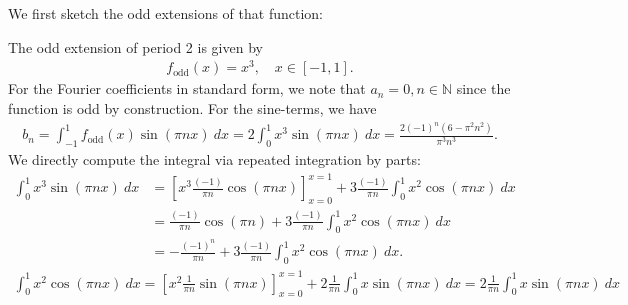 \documentclass[11pt]{article}
\begin{document}
\begin{solution}
    We first sketch the odd extensions of that function:
    \begin{center}
    \end{center}
    The odd extension of period 2 is given by
    \begin{align*}
        f_{\text{odd}}(x) = x^3, \quad x \in [-1,1].
    \end{align*}
    For the Fourier coefficients in standard form, we note that $a_n = 0, n \in \mathbb{N}$ since the function is odd by construction. For the sine-terms, we have
    \begin{align*}
        b_n = \int_{-1}^1 f_{\text{odd}}(x) \sin(\pi n x) \ dx = 2 \int_{0}^1 x^3 \sin(\pi n x) \ dx 
        = \frac{2(-1)^n (6 - \pi^2 n^2)}{\pi^3 n^3}.
    \end{align*}
    We directly compute the integral via repeated integration by parts:
    \begin{align*}
        \int_{0}^1 x^3 \sin(\pi n x) \ dx
        &
        =
        \left[ x^3 \tfrac{(-1)}{\pi n} \cos(\pi n x)\right]_{x=0}^{x=1}
        + 
        3 \tfrac{(-1)}{\pi n} \int_{0}^1 x^2 \cos(\pi n x) \ dx
        \\&
        =
        \tfrac{(-1)}{\pi n} \cos(\pi n) 
        + 
        3 \tfrac{(-1)}{\pi n} \int_{0}^1 x^2 \cos(\pi n x) \ dx
        \\&
        =
        - \tfrac{(-1)^{n}}{\pi n} 
        + 
        3 \tfrac{(-1)}{\pi n} \int_{0}^1 x^2 \cos(\pi n x) \ dx
        .
    \end{align*}
    \begin{align*}
        \int_{0}^1 x^2 \cos(\pi n x) \ dx
        =
        \left[ x^2 \tfrac{1}{\pi n} \sin(\pi n x)\right]_{x=0}^{x=1} 
        + 
        2 \tfrac{1}{\pi n} \int_{0}^1 x \sin(\pi n x) \ dx
        =
        2 \tfrac{1}{\pi n} \int_{0}^1 x \sin(\pi n x) \ dx

\end{align*}
\end{solution}
\end{document}

